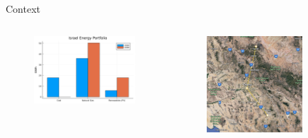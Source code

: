 \begin{frame}{Context}
  \begin{columns}
    \begin{column}{0.5\textwidth}
      \begin{figure}
        \centering
        \includegraphics[width=\textwidth]{energyPortfolio.png}
      \end{figure}
    \end{column}

    \begin{column}{0.5\textwidth}
      \begin{figure}
        \centering
        \includegraphics[width=0.75\textwidth]{israelLengthOnAZ.png}
      \end{figure}
    \end{column}
  \end{columns}
\end{frame}

